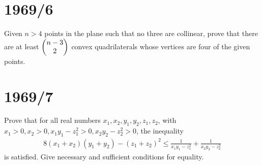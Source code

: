 \documentclass{article}
\begin{document}
\section*{1969/6}
Given $n > 4$ points in the plane such that no three are collinear, prove that there are at least $\begin{pmatrix}n-3\\2\end{pmatrix}$ convex quadrilaterals whose vertices are four of the given points.

\section*{1969/7}
Prove that for all real numbers $x_1, x_2, y_1, y_2, z_1, z_2$, with $x_1 > 0, x_2 > 0, x_1 y_1 - z_1^2 > 0, x_2 y_2 - z_2^2 > 0$, the inequality
\begin{align}
    8(x_1 + x_2)(y_1 + y_2) - (z_1 + z_2)^2 \leq \frac{1}{x_1 y_1 - z_1^2} + \frac{1}{x_2 y_2 - z_2^2}
\end{align}
is satisfied. Give necessary and sufficient conditions for equality.
\end{document}

